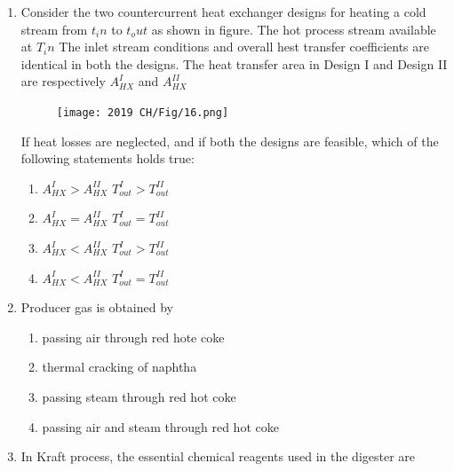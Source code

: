 \documentclass[journal,12pt,onecolumn]{IEEEtran}
\theoremstyle{remark}
\begin{document}
\begin{enumerate}
\begin{multicols}{4}
    \begin{enumerate}
        \item I,II,III
        \item III,I,II
        \item II,I,III
        \item III,II,I
    \end{enumerate}
\end{multicols}
\newpage
    \item Consider the two countercurrent heat exchanger designs for heating a cold stream from $t_in$ to $t_out$ as shown in figure. The hot process stream available at $T_in$ The inlet stream conditions and overall hest transfer coefficients are identical in both the designs. The heat transfer area in Design I and Design II are respectively $A^{I}_{HX}$ and $A^{II}_{HX}$ 
\begin{figure}[H]
    \centering
    \texttt{[image: 2019 CH/Fig/16.png]}
    \caption{}
    \label{fig:16}
\end{figure}
    If heat losses are neglected, and if both the designs are feasible, which of the following statements holds true:
    
    \hfill{}
\begin{enumerate}
     \item $A^{I}_{HX} > A^{II}_{HX}$ \hspace{5pt} $T^{I}_{out} > T^{II}_{out}$
    \item $A^{I}_{HX} = A^{II}_{HX}$ \hspace{5pt}  $T^{I}_{out} = T^{II}_{out}$
    \item $A^{I}_{HX} < A^{II}_{HX}$ \hspace{5pt}  $T^{I}_{out} > T^{II}_{out}$
    \item $A^{I}_{HX} < A^{II}_{HX}$  \hspace{5pt}  $T^{I}_{out} = T^{II}_{out}$
\end{enumerate} 

    \item Producer gas is obtained by
    
 \hfill{}
 
\begin{enumerate}
    \item passing air through red hote coke
    \item thermal cracking of naphtha
    \item passing steam through red hot coke
    \item passing air and steam through red hot coke
\end{enumerate}
    \item In Kraft process, the essential chemical reagents used in the digester are    
    

\end{enumerate}
\end{document}
